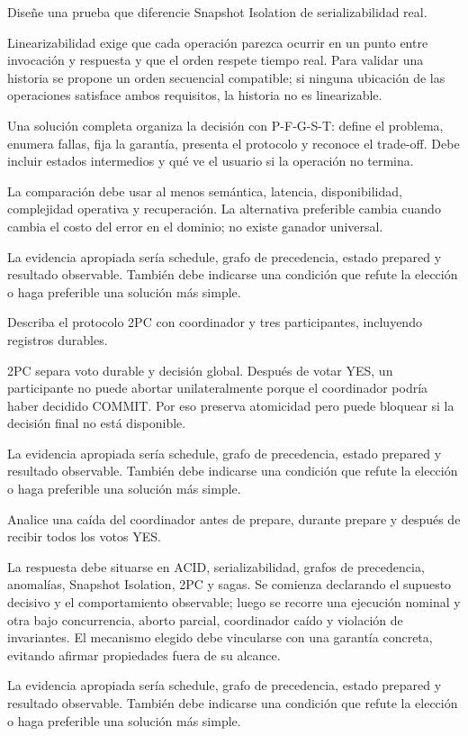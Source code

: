 \documentclass[variant=guia,cover=institutional,mode=screen]{ua-engineering-v6-article}
\begin{document}
\begin{uaexercise}
Diseñe una prueba que diferencie Snapshot Isolation de serializabilidad real.
\end{uaexercise}
\begin{uaanswer}
Linearizabilidad exige que cada operación parezca ocurrir en un punto entre invocación y respuesta y que el orden respete tiempo real. Para validar una historia se propone un orden secuencial compatible; si ninguna ubicación de las operaciones satisface ambos requisitos, la historia no es linearizable.

Una solución completa organiza la decisión con P-F-G-S-T: define el problema, enumera fallas, fija la garantía, presenta el protocolo y reconoce el trade-off. Debe incluir estados intermedios y qué ve el usuario si la operación no termina.

La comparación debe usar al menos semántica, latencia, disponibilidad, complejidad operativa y recuperación. La alternativa preferible cambia cuando cambia el costo del error en el dominio; no existe ganador universal.

La evidencia apropiada sería schedule, grafo de precedencia, estado prepared y resultado observable. También debe indicarse una condición que refute la elección o haga preferible una solución más simple.
\end{uaanswer}

\begin{uaexercise}
Describa el protocolo 2PC con coordinador y tres participantes, incluyendo registros durables.
\end{uaexercise}
\begin{uaanswer}
2PC separa voto durable y decisión global. Después de votar YES, un participante no puede abortar unilateralmente porque el coordinador podría haber decidido COMMIT. Por eso preserva atomicidad pero puede bloquear si la decisión final no está disponible.

La evidencia apropiada sería schedule, grafo de precedencia, estado prepared y resultado observable. También debe indicarse una condición que refute la elección o haga preferible una solución más simple.
\end{uaanswer}

\begin{uaexercise}
Analice una caída del coordinador antes de prepare, durante prepare y después de recibir todos los votos YES.
\end{uaexercise}
\begin{uaanswer}
La respuesta debe situarse en ACID, serializabilidad, grafos de precedencia, anomalías, Snapshot Isolation, 2PC y sagas. Se comienza declarando el supuesto decisivo y el comportamiento observable; luego se recorre una ejecución nominal y otra bajo concurrencia, aborto parcial, coordinador caído y violación de invariantes. El mecanismo elegido debe vincularse con una garantía concreta, evitando afirmar propiedades fuera de su alcance.

La evidencia apropiada sería schedule, grafo de precedencia, estado prepared y resultado observable. También debe indicarse una condición que refute la elección o haga preferible una solución más simple.
\end{uaanswer}
\end{document}
